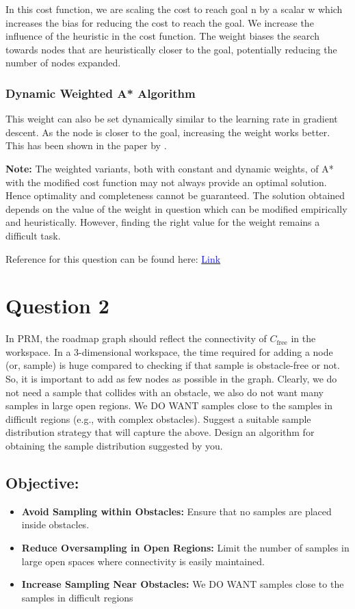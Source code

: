 \documentclass[11pt]{article}
\begin{document}
In this cost function, we are scaling the cost to reach goal n by a scalar w which increases the bias for reducing the cost to reach the goal. We increase the influence of the heuristic in the cost function. The weight biases the search towards nodes that are heuristically closer to the goal, potentially reducing the number of nodes expanded.

\subsubsection*{Dynamic Weighted A* Algorithm}
This weight can also be set dynamically similar to the learning rate in gradient descent. As the node is closer to the goal, increasing the weight works better. This has been shown in the paper by \cite{chen2021necessary}.
\newline

\textbf{Note:} The weighted variants, both with constant and dynamic weights, of A* with the modified cost function may not always provide an optimal solution. Hence optimality and completeness cannot be guaranteed. The solution obtained depends on the value of the weight in question which can be modified empirically and heuristically. However, finding the right value for the weight remains a difficult task.

Reference for this question can be found here: \href{https://theory.stanford.edu/~amitp/GameProgramming/Variations.html}{\textcolor{blue}{Link}}



\section*{Question 2}
In PRM, the roadmap graph should reflect the connectivity of $C_{\text{free}}$ in the workspace. In a 3-dimensional workspace, the time required for adding a node (or, sample) is huge compared to checking if that sample is obstacle-free or not. So, it is important to add as few nodes as possible in the graph. Clearly, we do not need a sample that collides with an obstacle, we also do not want many samples in large open regions. We DO WANT samples close to the samples in difficult regions (e.g., with complex obstacles). Suggest a suitable sample distribution strategy that will capture the above. Design an algorithm for obtaining the sample distribution suggested by you.

\subsection*{Objective: }
\begin{itemize}
  \item \textbf{Avoid Sampling within Obstacles:} Ensure that no samples are placed inside obstacles.
  \item \textbf{Reduce Oversampling in Open Regions:} Limit the number of samples in large open spaces where connectivity is easily maintained.
  \item \textbf{Increase Sampling Near Obstacles:} We DO WANT samples close to the samples in difficult regions
\end{itemize}
\end{document}
